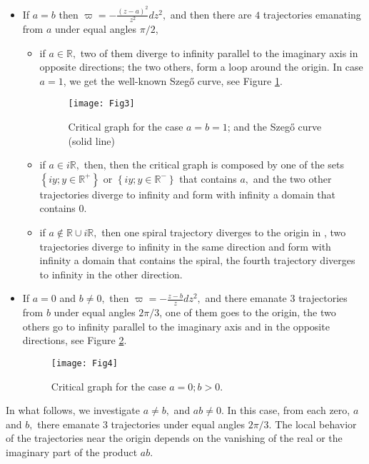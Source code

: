 \documentclass[12pt]{amsart}
\begin{document}
\begin{itemize}
\item If $a=b$ then $\varpi =-\frac{\left( z-a\right) ^{2}}{z^{2}}dz^{2},$
and then there are $4$ trajectories emanating from $a$ under equal angles $\pi /2$,

\begin{itemize}
\item if $a\in 
\mathbb{R}
,$ two of them diverge to infinity parallel to the imaginary axis in
opposite directions; the two others, form a loop around the origin. In case $a=1$, we get the well-known Szeg\H{o} curve, see Figure \ref{Fig3}.
\begin{figure}[h]
\begin{center}
\texttt{[image: Fig3]}
\caption[le titre]{  Critical graph for the case $a=b=1$; and the Szeg\H{o} curve (solid line)
}
\label{Fig3}
\end{center}
\end{figure}
\item if $a\in i\mathbb{R}
,$ then, then the critical graph is composed by one of the sets $\left\{
iy;y\in 
\mathbb{R}
^{+}\right\} $ or $\left\{ iy;y\in 
\mathbb{R}
^{-}\right\} $ that contains $a,$ and the two other trajectories diverge to
infinity and form with infinity a domain that contains $0$.

\item if $a\notin 
\mathbb{R}
\cup i\mathbb{R}
,$ then one spiral trajectory diverges to the origin in , two trajectories
diverge to infinity in the same direction and form with infinity a domain
that contains the spiral, the fourth trajectory diverges to infinity in the
other direction.
\end{itemize}

\item If $a=0$ and $b\neq 0,$ then $\varpi =-\frac{z-b}{z}dz^{2},$ and there
emanate $3$ trajectories from $b$ under equal angles $2\pi /3$, one of them
goes to the origin, the two others go to infinity parallel to the imaginary
axis and in the opposite directions, see Figure \ref{Fig4}.
\begin{figure}[h]
\begin{center}
\texttt{[image: Fig4]}
\caption[le titre]{ Critical graph for the case $a = 0; b > 0.$}
\label{Fig4}
\end{center}
\end{figure}
\end{itemize}

In what follows, we investigate $a\neq b,$ and $ab\neq 0.$ In this case,
from each zero, $a$ and $b,$ there emanate $3$ trajectories under equal
angles $2\pi /3$. The local behavior of the trajectories near the origin
depends on the vanishing of the real or the imaginary part of the product $ab $.
\end{document}
